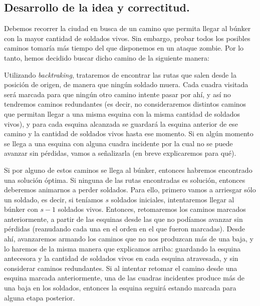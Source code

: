 \vspace*{0.6cm}

\subsection{Desarrollo de la idea y correctitud.}

\vspace*{0.3cm}

Debemos recorrer la ciudad en busca de un camino que permita llegar al búnker con la mayor cantidad de soldados vivos.  Sin embargo, probar todos los posibles caminos tomaría más tiempo del que disponemos en un ataque zombie.  Por lo tanto, hemos decidido buscar dicho camino de la siguiente manera:

Utilizando {\it backtraking}, trataremos de encontrar las rutas que salen desde la posición de origen, de manera que ningún soldado muera.  Cada cuadra visitada será marcada para que ningún otro camino intente pasar por ahí, y así no tendremos caminos redundantes (es decir, no consideraremos distintos caminos que permitan llegar a una misma esquina con la misma cantidad de soldados vivos), y para cada esquina alcanzada se guardará la esquina anterior de ese camino y la cantidad de soldados vivos hasta ese momento.  Si en algún momento se llega a una esquina con alguna cuadra incidente por la cual no se puede avanzar sin pérdidas, vamos a señalizarla (en breve explicaremos para qué).

Si por alguno de estos caminos se llega al búnker, entonces habremos encontrado una solución óptima.  Si ninguna de las rutas encontradas es solución, entonces deberemos animarnos a perder soldados.  Para ello, primero vamos a arriesgar sólo un soldado, es decir, si teníamos $s$ soldados iniciales, intentaremos llegar al búnker con $s-1$ soldados vivos. Entonces, retomaremos los caminos marcados anteriormente, a partir de las esquinas desde las que no podíamos avanzar sin pérdidas (reanudando cada una en el orden en el que fueron marcadas).  Desde ahí, avanzaremos armando los caminos que no nos produzcan más de una baja, y lo haremos de la misma manera que explicamos arriba: guardando la esquina antecesora y la cantidad de soldados vivos en cada esquina atravesada, y sin considerar caminos redundantes. Si al intentar retomar el camino desde una esquina marcada anteriormente, una de las cuadras incidentes produce más de una baja en los soldados, entonces la esquina seguirá estando marcada para alguna etapa posterior.

